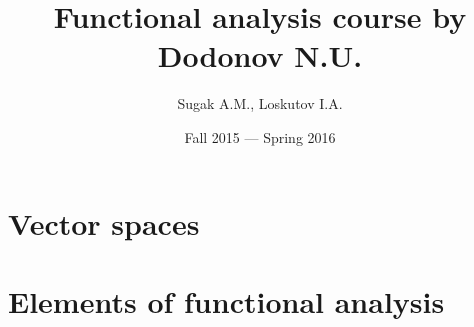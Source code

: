 \documentclass[12pt, a4paper, fleqn, draft]{report}
\author{Sugak A.M., Loskutov I.A.}
\title{Functional analysis course by Dodonov N.U.}
\date{Fall 2015 --- Spring 2016}
\begin{document}
\maketitle
\tableofcontents
\newpage
\chapter{Vector spaces}








\chapter{Elements of functional analysis}






\end{document}
